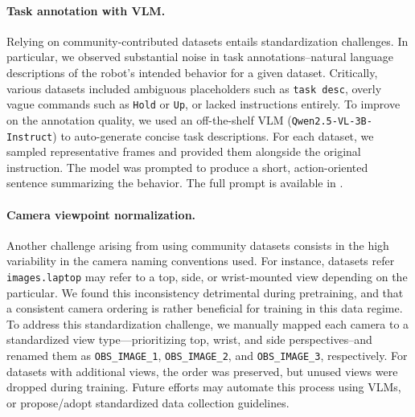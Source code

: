 \vspace{-0.4cm}
\begin{table}
    \centering
    \setlength{\tabcolsep}{8pt} %
    \renewcommand{\arraystretch}{1} %
    \vspace{-0.4cm}
    \label{tab:pretraining_data}
\end{table}

\paragraph{Task annotation with VLM.} 
Relying on community-contributed datasets entails standardization challenges. In particular, we observed substantial noise in task annotations--natural language descriptions of the robot’s intended behavior for a given dataset. 
Critically, various datasets included ambiguous placeholders such as \texttt{task desc}, overly vague commands such as \texttt{Hold} or \texttt{Up}, or lacked instructions entirely. To improve on the annotation quality, we used an off-the-shelf VLM (\texttt{Qwen2.5-VL-3B-Instruct}) to auto-generate concise task descriptions. For each dataset, we sampled representative frames and provided them alongside the original instruction. The model was prompted to produce a short, action-oriented sentence summarizing the behavior. The full prompt is available in .

\paragraph{Camera viewpoint normalization.} 
Another challenge arising from using community datasets consists in the high variability in the camera naming conventions used. For instance, datasets refer \texttt{images.laptop} may refer to a top, side, or wrist-mounted view depending on the particular. We found this inconsistency detrimental during pretraining, and that a consistent camera ordering is rather beneficial for training in this data regime. To address this standardization challenge, we manually mapped each camera to a standardized view type—prioritizing top, wrist, and side perspectives--and renamed them as \texttt{OBS\_IMAGE\_1}, \texttt{OBS\_IMAGE\_2}, and \texttt{OBS\_IMAGE\_3}, respectively. 
For datasets with additional views, the order was preserved, but unused views were dropped during training. Future efforts may automate this process using VLMs, or propose/adopt standardized data collection guidelines.

